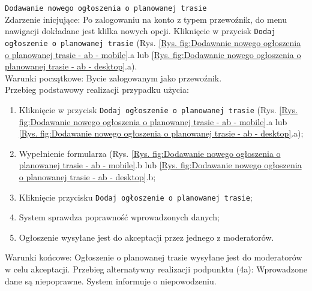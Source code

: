 \texttt{Dodawanie nowego ogłoszenia o planowanej trasie} \\
Zdarzenie inicjujące: Po zalogowaniu na konto z typem przewoźnik, do menu nawigacji dokładane jest klilka nowych opcji. Kliknięcie w przycisk \texttt{Dodaj ogłoszenie o planowanej trasie} (Rys. \ref{Rys. fig:Dodawanie nowego ogłoszenia o planowanej trasie - ab - mobile}.a lub \ref{Rys. fig:Dodawanie nowego ogłoszenia o planowanej trasie - ab - desktop}.a). \\
Warunki początkowe: Bycie zalogowanym jako przewoźnik. \\
Przebieg podstawowy realizacji przypadku użycia:
\begin{enumerate}
    \item Kliknięcie w przycisk \texttt{Dodaj ogłoszenie o planowanej trasie} (Rys. \ref{Rys. fig:Dodawanie nowego ogłoszenia o planowanej trasie - ab - mobile}.a lub \ref{Rys. fig:Dodawanie nowego ogłoszenia o planowanej trasie - ab - desktop}.a);
    \item Wypełnienie formularza (Rys. \ref{Rys. fig:Dodawanie nowego ogłoszenia o planowanej trasie - ab - mobile}.b lub \ref{Rys. fig:Dodawanie nowego ogłoszenia o planowanej trasie - ab - desktop}.b;
    \item Kliknięcie przycisku \texttt{Dodaj ogłoszenie o planowanej trasie};
    \item System sprawdza poprawność wprowadzonych danych;
    \item Ogłoszenie wysyłane jest do akceptacji przez jednego z moderatorów.
\end{enumerate}
Warunki końcowe: Ogłoszenie o planowanej trasie wysyłane jest do moderatorów w celu akceptacji.
Przebieg alternatywny realizacji podpunktu (4a): Wprowadzone dane są niepoprawne. System informuje o niepowodzeniu. \\
